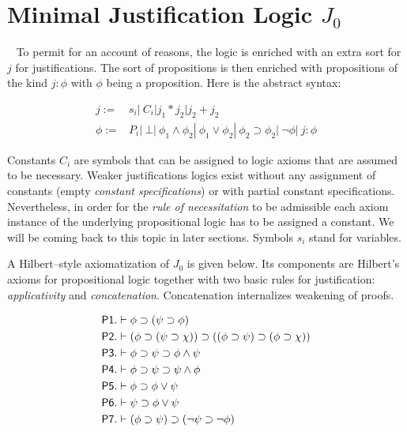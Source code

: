 \section{Minimal Justification Logic $J_0$}~\label{min:jo}
To permit for an account of reasons, the logic is enriched with an extra sort for $j$ for justifications. The sort of propositions is then enriched with propositions of the kind $j:\phi$ with $\phi$ being a proposition. Here is the abstract syntax:

\begin{mdframed}
\begin{align*}
j := &s_i|\ C_i| j_1*j_2| j_2 + j_2\\
 \phi:=& P_i|\ \bot|\ \phi_1\wedge\phi_2|\ \phi_1\vee\phi_2| \ \phi_2\supset\phi_2|\ \neg\phi|\ j:\phi   
\end{align*}
\end{mdframed}
Constants $C_i$ are symbols that can be assigned to logic axioms that are assumed to be necessary. Weaker justifications logics exist without any assignment of constants (empty \emph{constant specifications}) or with partial constant specifications. Nevertheless, in order for the  \emph{rule of necessitation} to be admissible each axiom instance of the underlying propositional logic has to be assigned a constant. We will be coming back to this topic in later sections. Symbols $s_i$ stand for variables.

A Hilbert--style axiomatization of $J_0$ is given below. Its components are Hilbert's axioms for propositional logic together with two basic rules for justification: \emph{applicativity} and \emph{concatenation}. Concatenation internalizes weakening of proofs.
\begin{mdframed}
\begin{align*}
&\sf{P1}.  \vdash \phi\supset(\psi\supset\phi)\\
& \sf{P2}. \vdash (\phi\supset(\psi\supset\chi))\supset((\phi\supset\psi)\supset(\phi\supset\chi))\\
& \sf{P3}. \vdash \phi\supset\psi\supset\phi\wedge\psi\\
&\sf{P4}. \vdash \phi\supset\psi\supset\psi\wedge\phi\\
&\sf{P5}.  \vdash \phi\supset\phi\vee\psi\\
&\sf{P6}. \vdash \psi\supset\phi\vee\psi\\
&\sf{P7}. \vdash (\phi\supset\psi)\supset(\neg\psi\supset\neg\phi)\\
\end{align*}
\end{mdframed}


